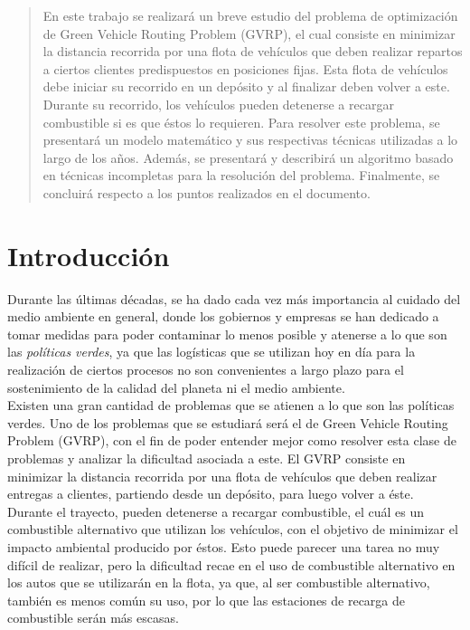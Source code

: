 \documentclass[letter, 10pt]{article}
\begin{document}
\begin{abstract}

En este trabajo se realizará un breve estudio del problema de optimización de Green Vehicle Routing Problem (GVRP), el cual consiste en minimizar la distancia recorrida por una flota de vehículos que deben realizar repartos a ciertos clientes predispuestos en posiciones fijas. Esta flota de vehículos debe iniciar su recorrido en un depósito y al finalizar deben volver a este. Durante su recorrido, los vehículos pueden detenerse a recargar combustible si es que éstos lo requieren. Para resolver este problema, se presentará un modelo matemático y sus respectivas técnicas utilizadas a lo largo de los años. Además, se presentará y describirá un algoritmo basado en técnicas incompletas para la resolución del problema. Finalmente, se concluirá respecto a los puntos realizados en el documento.
\end{abstract}

\section{Introducci\'on}


Durante las últimas décadas, se ha dado cada vez más importancia al cuidado del medio ambiente en general, donde los gobiernos y empresas se han dedicado a tomar medidas para poder contaminar lo menos posible y atenerse a lo que son las \emph{políticas verdes}, ya que las logísticas que se utilizan hoy en día para la realización de ciertos procesos no son convenientes a largo plazo para el sostenimiento de la calidad del planeta ni el medio ambiente.
\\

Existen una gran cantidad de problemas que se atienen a lo que son las políticas verdes. Uno de los problemas que se estudiará será el de Green Vehicle Routing Problem (GVRP), con el fin de poder entender mejor como resolver esta clase de problemas y analizar la dificultad asociada a este. El GVRP consiste en minimizar la distancia recorrida por una flota de vehículos que deben realizar entregas a clientes, partiendo desde un depósito, para luego volver a éste. Durante el trayecto, pueden detenerse a recargar combustible, el cuál es un combustible alternativo que utilizan los vehículos, con el objetivo de minimizar el impacto ambiental producido por éstos. Esto puede parecer una tarea no muy difícil de realizar, pero la dificultad recae en el uso de combustible alternativo en los autos que se utilizarán en la flota, ya que, al ser combustible alternativo, también es menos común su uso, por lo que las estaciones de recarga de combustible serán más escasas.
\\
\end{document}
